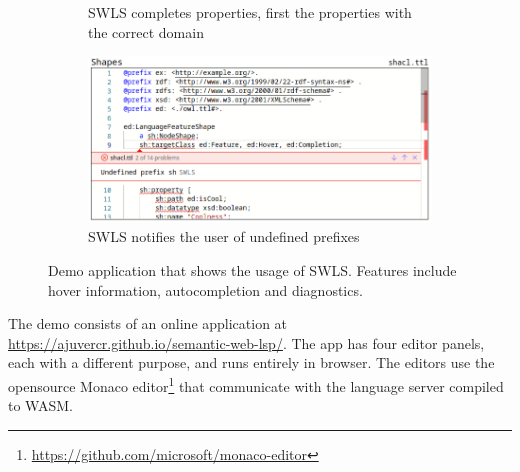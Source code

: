 \begin{figure}[tb]
\begin{subfigure}{0.48\textwidth}
      \caption{SWLS completes properties, first the properties with the correct domain}
      \label{property_completion}
    \end{subfigure}
    \hfill
    \begin{subfigure}{0.48\textwidth}
      \includegraphics[width=\textwidth]{./images/undefined.png}
      \caption{SWLS notifies the user of undefined prefixes}
      \label{undefined_prefix}
    \end{subfigure}
    \caption{
      Demo application that shows the usage of SWLS. Features include hover information, autocompletion and diagnostics.
    }\label{lst:Demo}
\end{figure}

The demo consists of an online application at \url{https://ajuvercr.github.io/semantic-web-lsp/}.
The app has four editor panels, each with a different purpose, and runs entirely in browser. The editors use the opensource Monaco editor\footnote{\url{https://github.com/microsoft/monaco-editor}}
that communicate with the language server compiled to WASM.
%

